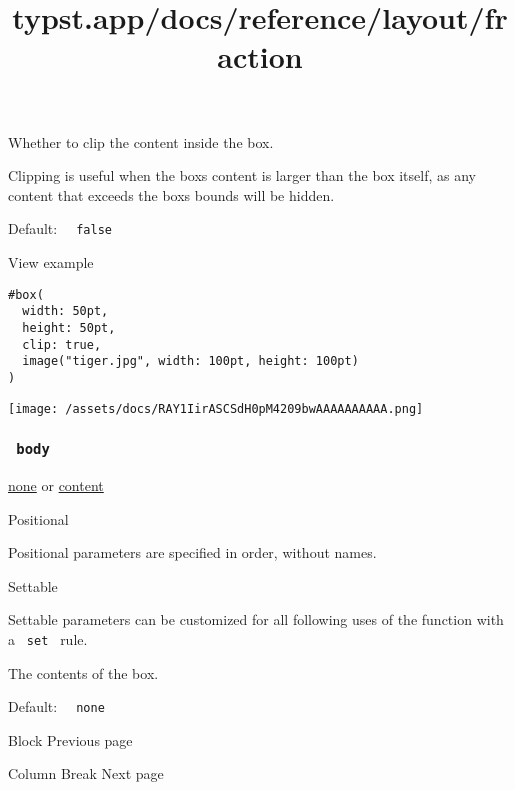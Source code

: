 Whether to clip the content inside the box.

Clipping is useful when the box\textquotesingle s content is larger than
the box itself, as any content that exceeds the box\textquotesingle s
bounds will be hidden.

Default: \texttt{\ }{\texttt{\ false\ }}\texttt{\ }


View example

\begin{verbatim}
#box(
  width: 50pt,
  height: 50pt,
  clip: true,
  image("tiger.jpg", width: 100pt, height: 100pt)
)
\end{verbatim}

\texttt{[image: /assets/docs/RAY1IirASCSdH0pM4209bwAAAAAAAAAA.png]}

\subsubsection{\texorpdfstring{\texttt{\ body\ }}{ body }}\label{parameters-body}

\href{/docs/reference/foundations/none/}{none} {or}
\href{/docs/reference/foundations/content/}{content}

{{ Positional }}

\label{parameters-body-positional-tooltip}
Positional parameters are specified in order, without names.

{{ Settable }}

\label{parameters-body-settable-tooltip}
Settable parameters can be customized for all following uses of the
function with a \texttt{\ set\ } rule.

The contents of the box.

Default: \texttt{\ }{\texttt{\ none\ }}\texttt{\ }

\href{/docs/reference/layout/block/}{\pandocbounded{}}

{ Block } { Previous page }

\href{/docs/reference/layout/colbreak/}{\pandocbounded{}}

{ Column Break } { Next page }


\title{typst.app/docs/reference/layout/fraction}

